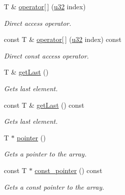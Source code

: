 \begin{DoxyCompactItemize}
T \& \hyperlink{classirr_1_1core_1_1array_a1e09dc5cc93e88fd3a37cad011b3b531}{operator\mbox{[}$\,$\mbox{]}} (\hyperlink{namespaceirr_a0416a53257075833e7002efd0a18e804}{u32} index)
\begin{DoxyCompactList}\small\item\em Direct access operator. \end{DoxyCompactList}\item 
\mbox{\label{classirr_1_1core_1_1array_aa3f3c984a95034950f1005f016ad0fb8}} 
const T \& \hyperlink{classirr_1_1core_1_1array_aa3f3c984a95034950f1005f016ad0fb8}{operator\mbox{[}$\,$\mbox{]}} (\hyperlink{namespaceirr_a0416a53257075833e7002efd0a18e804}{u32} index) const
\begin{DoxyCompactList}\small\item\em Direct const access operator. \end{DoxyCompactList}\item 
\mbox{\label{classirr_1_1core_1_1array_ad87dc5db8bf6ec1033c945a0d3724e09}} 
T \& \hyperlink{classirr_1_1core_1_1array_ad87dc5db8bf6ec1033c945a0d3724e09}{get\+Last} ()
\begin{DoxyCompactList}\small\item\em Gets last element. \end{DoxyCompactList}\item 
\mbox{\label{classirr_1_1core_1_1array_a6cc770ec657432983b7245b2b2473f42}} 
const T \& \hyperlink{classirr_1_1core_1_1array_a6cc770ec657432983b7245b2b2473f42}{get\+Last} () const
\begin{DoxyCompactList}\small\item\em Gets last element. \end{DoxyCompactList}\item 
T $\ast$ \hyperlink{classirr_1_1core_1_1array_a7b29797486e1c2ab3e7821082dab998c}{pointer} ()
\begin{DoxyCompactList}\small\item\em Gets a pointer to the array. \end{DoxyCompactList}\item 
const T $\ast$ \hyperlink{classirr_1_1core_1_1array_a8df928a9e555327c085b20f392e409ee}{const\+\_\+pointer} () const
\begin{DoxyCompactList}\small\item\em Gets a const pointer to the array. \end{DoxyCompactList}\item 

\end{DoxyCompactItemize}
